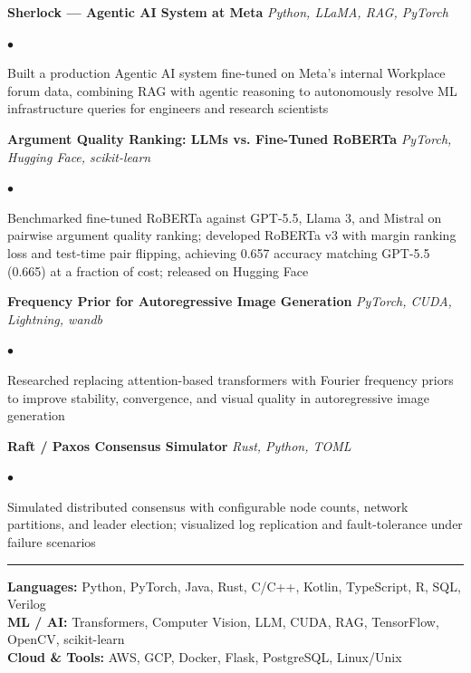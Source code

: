 \documentclass[9.5pt, letterpaper]{article}
\renewcommand{\section}[1]{%
  \vspace{6pt}\noindent{\large\textbf{#1}}\par\vspace{-5pt}\noindent\rule{\linewidth}{0.4pt}\vspace{2pt}%
}
\newenvironment{tightlist}{
  \begin{list}{$\bullet$}{
    \setlength{\topsep}{1pt}
    \setlength{\itemsep}{0pt}
    \setlength{\parsep}{0pt}
    \setlength{\leftmargin}{1.2em}
  }
}{\end{list}}
\begin{document}
\textbf{Sherlock — Agentic AI System at Meta} \hfill \textit{Python, LLaMA, RAG, PyTorch}
\begin{tightlist}
  \item Built a production Agentic AI system fine-tuned on Meta's internal Workplace forum data, combining RAG with agentic reasoning to autonomously resolve ML infrastructure queries for engineers and research scientists
\end{tightlist}

\smallskip

\textbf{Argument Quality Ranking: LLMs vs. Fine-Tuned RoBERTa} \hfill \textit{PyTorch, Hugging Face, scikit-learn}
\begin{tightlist}
  \item Benchmarked fine-tuned RoBERTa against GPT-5.5, Llama 3, and Mistral on pairwise argument quality ranking; developed RoBERTa v3 with margin ranking loss and test-time pair flipping, achieving 0.657 accuracy matching GPT-5.5 (0.665) at a fraction of cost; released on Hugging Face
\end{tightlist}

\smallskip

\textbf{Frequency Prior for Autoregressive Image Generation} \hfill \textit{PyTorch, CUDA, Lightning, wandb}
\begin{tightlist}
  \item Researched replacing attention-based transformers with Fourier frequency priors to improve stability, convergence, and visual quality in autoregressive image generation
\end{tightlist}

\smallskip

\textbf{Raft / Paxos Consensus Simulator} \hfill \textit{Rust, Python, TOML}
\begin{tightlist}
  \item Simulated distributed consensus with configurable node counts, network partitions, and leader election; visualized log replication and fault-tolerance under failure scenarios
\end{tightlist}

\section{SKILLS}

\textbf{Languages:} Python, PyTorch, Java, Rust, C/C++, Kotlin, TypeScript, R, SQL, Verilog\\
\textbf{ML / AI:} Transformers, Computer Vision, LLM, CUDA, RAG, TensorFlow, OpenCV, scikit-learn\\
\textbf{Cloud \& Tools:} AWS, GCP, Docker, Flask, PostgreSQL, Linux/Unix
\end{document}
